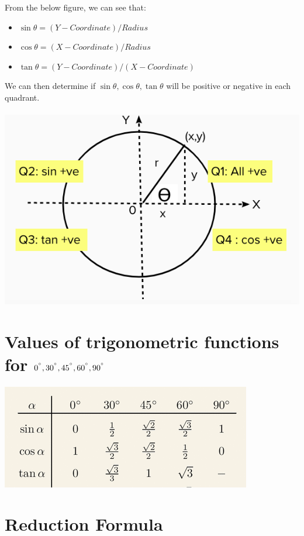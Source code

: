 \documentclass{book}
\begin{document}
	 From the below figure, we can see that:
	 \begin{itemize}
		\item $\sin\theta = (Y-Coordinate)/Radius$
		\item $\cos\theta = (X-Coordinate)/Radius$
		\item $\tan\theta = (Y-Coordinate)/(X-Coordinate)$
	 \end{itemize}
	 We can then determine if $\sin\theta, \cos\theta, \tan\theta$ will be positive or negative in each quadrant. \\ \\
	 \includegraphics[scale=0.6]{unitcircle}
	 
	 \section{Values of trigonometric functions for $0^{\degree}, 30^{\degree}, 45^{\degree},60^{\degree},90^{\degree}$}
	 
	 \includegraphics[scale=0.6]{values} \\
	
	\section{Reduction Formula}
	
\end{document}
